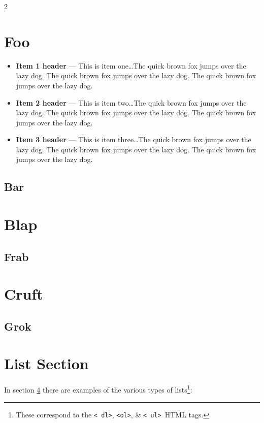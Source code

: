 \documentclass[11pt]{article}%
\begin{document}
\begin{multicols}{2}
\section{Foo}
\lipsum[1-4]
\begin{itemize}
\item {\bf Item 1 header} --- This is item one\dots The quick brown fox jumps over the lazy dog. The quick brown fox jumps over the lazy dog. The quick brown fox jumps over the lazy dog.
\item {\bf Item 2 header} --- This is item two\dots The quick brown fox jumps over the lazy dog. The quick brown fox jumps over the lazy dog. The quick brown fox jumps over the lazy dog.
\item {\bf Item 3 header} --- This is item three\dots The quick brown fox jumps over the lazy dog. The quick brown fox jumps over the lazy dog. The quick brown fox jumps over the lazy dog.
\end{itemize}
\subsection{Bar}
\lipsum[5-8]
\section{Blap}
\lipsum[1-4]
\subsection{Frab}
\lipsum[5-8]
\section{Cruft}
\lipsum[1-4]
\subsection{Grok}
\lipsum[5-8]

\section{List Section}
\label{List Section}

In section \ref{List Section} there are examples of the various
types of lists\footnote{These correspond to the {\tt \textless
dl\textgreater}, {\tt \textless ol\textgreater}, \& {\tt \textless
ul\textgreater}\ HTML tags.}:


\end{multicols}
\end{document}
